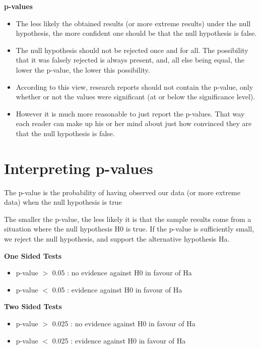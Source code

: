 \documentclass[]{report}
\begin{document}
	
	
	
	\textbf{p-values}
	\begin{itemize}
		\item The less likely the obtained results (or more extreme results) under the null hypothesis, the more confident one should be that the null hypothesis is false. \item The null hypothesis should not be rejected once and for all. The possibility that it was falsely rejected is always present, and, all else being equal, the lower the p-value, the lower this possibility.
		\item According to this view, research reports should not contain the p-value, only whether or not the values were significant (at or below the significance level).
		\item
		However it is much more reasonable to just report the p-values. That way each reader can make up his or her mind about just how convinced they are that the null hypothesis is false.
	\end{itemize}
	
	
	
	
	\section{Interpreting p-values}
	
	The p-value is the probability of having observed our data (or more extreme data) when the null hypothesis is true 
	
	The smaller the p-value, the less likely it is that the sample results come from a situation where the null hypothesis H0 is true. If the p-value is sufficiently small, we reject the null hypothesis, and support the alternative hypothesis Ha.
	
	\begin{framed}	
		\textbf{One Sided Tests}
		\begin{itemize}
			\item 		p-value  $>$  0.05   :   no evidence against H0 in favour of Ha
			
			\item 	p-value    $<$  0.05   :   evidence against H0 in favour of Ha
		\end{itemize}	
		\textbf{Two Sided Tests}
		\begin{itemize}
			\item 	p-value    $>$  0.025   :   no evidence against H0 in favour of Ha
			
			\item 	p-value    $<$  0.025   :   evidence against H0 in favour of Ha
		\end{itemize}		
	\end{framed}
	
\end{document}
